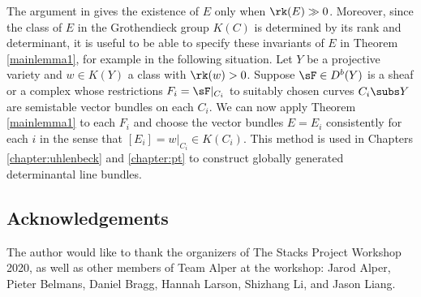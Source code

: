 The argument in \cite{seshadri} gives the existence of $E$ only when $\rk(E) \gg 0$. Moreover, since the class of $E$ in the Grothendieck group $K(C)$ is determined by its rank and determinant, it is useful to be able to specify these invariants of $E$ in Theorem \ref{mainlemma1}, for example in the following situation. Let $Y$ be a projective variety and $w \in K(Y)$ a class with $\rk(w) > 0$. Suppose $\sF \in D^b(Y)$ is a sheaf or a complex whose restrictions $F_i = \sF|_{C_i}$ to suitably chosen curves $C_i \subs Y$ are semistable vector bundles on each $C_i$. We can now apply Theorem \ref{mainlemma1} to each $F_i$ and choose the vector bundles $E = E_i$ consistently for each $i$ in the sense that $[E_i] = w|_{C_i} \in K(C_i)$. This method is used in Chapters \ref{chapter:uhlenbeck} and \ref{chapter:pt} to construct globally generated determinantal line bundles.

\subsection*{Acknowledgements} 
The author would like to thank the organizers of The Stacks Project Workshop 2020, as well as other members of Team Alper at the workshop: Jarod Alper, Pieter Belmans, Daniel Bragg, Hannah Larson, Shizhang Li, and Jason Liang.

